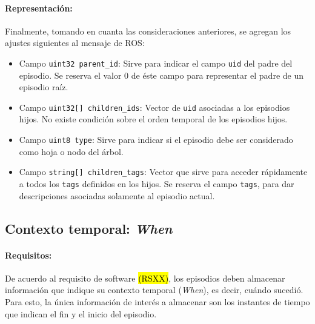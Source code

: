 \paragraph{Representación:}
Finalmente, tomando en cuanta las consideraciones anteriores, se agregan los ajustes siguientes al mensaje de ROS:
\begin{itemize}
\item Campo \texttt{uint32 parent\_id}: Sirve para indicar el campo \texttt{uid} del padre del episodio. Se reserva el valor $0$ de éste campo para representar el padre de un episodio raíz.
\item Campo \texttt{uint32[] children\_ids}: Vector de \texttt{uid} asociadas a los episodios hijos. No existe condición sobre el orden temporal de los episodios hijos.
\item Campo \texttt{uint8 type}: Sirve para indicar si el episodio debe ser considerado como hoja o nodo del árbol.
\item Campo \texttt{string[] children\_tags}: Vector que sirve para acceder rápidamente a todos los \texttt{tags} definidos en los hijos. Se reserva el campo \texttt{tags}, para dar descripciones asociadas solamente al episodio actual.
\end{itemize}
 
 
\subsection{Contexto temporal: \textit{When}}\label{sec:design_ep_when}

\paragraph{Requisitos:}
De acuerdo al requisito de software \hl{(RSXX)}, los episodios deben almacenar información que indique su contexto temporal (\textit{When}), es decir, cuándo  sucedió. Para esto, la única información de interés a almacenar son los instantes de tiempo que indican el fin y el inicio del episodio.

